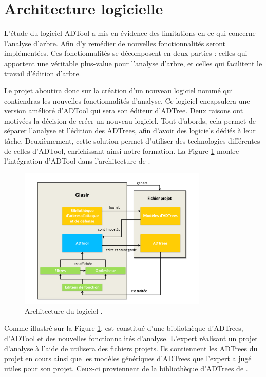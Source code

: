 \section{Architecture logicielle}
	\label{section:archi}



L'étude du logiciel ADTool a mis en évidence des limitations en ce qui concerne l'analyse d'arbre. Afin d'y remédier de nouvelles fonctionnalités seront implémentées. Ces fonctionnalités se décomposent en deux parties : celles-qui apportent une véritable plus-value pour l'analyse d'arbre, et celles qui facilitent le travail d'édition d'arbre. 

Le projet aboutira donc sur la création d'un nouveau logiciel nommé \glasir{} qui contiendras les nouvelles fonctionnalités d'analyse. Ce logiciel encapsulera une version amélioré d'ADTool qui sera son éditeur d'ADTree. Deux raisons ont motivées la décision de créer un nouveau logiciel. Tout d'abords, cela permet de séparer l'analyse et l'édition des ADTrees, afin d'avoir des logiciels dédiés à leur tâche. Deuxièmement, cette solution permet d'utiliser des technologies différentes de celles d'ADTool, enrichissant ainsi notre formation. La {\sc Figure} \ref{fig:architecture_Glasir} montre l'intégration d'ADTool dans l'architecture de \glasir{}.

	\begin{figure}[h!]
		\centering
			\includegraphics[width=0.8\textwidth]{figure/archiGlasir.pdf}
		\caption{Architecture du logiciel \glasir{}.}
		\label{fig:architecture_Glasir}
	\end{figure}

Comme illustré sur la {\sc Figure} \ref{fig:architecture_Glasir}, \glasir{} est constitué d'une bibliothèque d'ADTrees, d'ADTool et des nouvelles fonctionnalités d'analyse. L'expert réalisant un projet d'analyse à l'aide de \glasir{} utilisera des fichiers projets. Ils contiennent les ADTrees du projet en cours ainsi que les modèles génériques d'ADTrees que l'expert a jugé utiles pour son projet. Ceux-ci proviennent de la bibliothèque d'ADTrees de \glasir{}.
	
